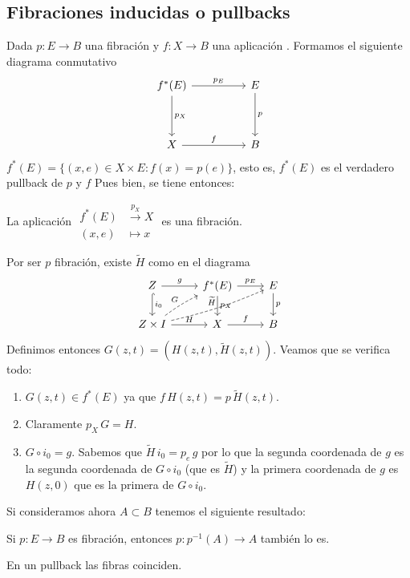\subsection*{Fibraciones inducidas o pullbacks}
Dada $p : E \longrightarrow B$ una fibración y $f : X \longrightarrow B$ una aplicación . Formamos el siguiente diagrama conmutativo
\[
\begin{tikzcd}
f^*(E) \arrow{rr}{p_E} \arrow{dd}{p_X} & & E \arrow{dd}{p} \\
\\
X \arrow{rr}{f} & & B
\end{tikzcd}
\]
$f^*(E) = \{ (x,e) \in X \times E : f(x) = p(e) \}$, esto es, $f^*(E)$ es el verdadero pullback de $p$ y $f$ Pues bien, se tiene entonces:
\begin{teor}
La aplicación 
$\begin{aligned}
f^*(E) &\stackrel{p_X}{\longrightarrow} X \\
(x,e) &\longmapsto x
\end{aligned}$ es una fibración.
\end{teor}
\begin{demo}
Por ser $p$ fibración, existe $\widetilde{H}$ como en el diagrama
\[
\begin{tikzcd}
Z\rar{g} \dar[hook]{i_0} & f^*(E) \rar{p_E} \dar{p_X} & E \dar{p} \\
Z\times I \rar{H} \arrow[dashed, bend left=5]{ur}{G} \arrow[dashed, bend right=5]{rru}{\widetilde{H}} & X \rar{f} & B
\end{tikzcd}
\]
Definimos entonces $G(z,t) = (H(z,t), \widetilde{H}(z,t))$. Veamos que se verifica todo:
\begin{enumerate}
\item $G(z,t) \in f^*(E)$ ya que $f \, H(z,t) = p \, \widetilde{H}(z,t)$.
\item Claramente $p_X \, G = H$.
\item $G \circ i_0 = g$. Sabemos que $\widetilde{H} \, i_0 = p_e \, g$ por lo que la segunda coordenada de $g$ es la segunda coordenada de $G \circ i_0$ (que es $\widetilde{H}$) y la primera coordenada de $g$ es $H(z,0)$ que es la primera de $G \circ i_0$. 
\end{enumerate}
\end{demo}
Si consideramos ahora $A \subset B$ tenemos el siguiente resultado:
\begin{coro}
Si $p : E \longrightarrow B$ es fibración, entonces $p : p^{-1}(A) \longrightarrow A$ también lo es.
\end{coro}
\begin{prop}
En un pullback las fibras coinciden.
\end{prop}
